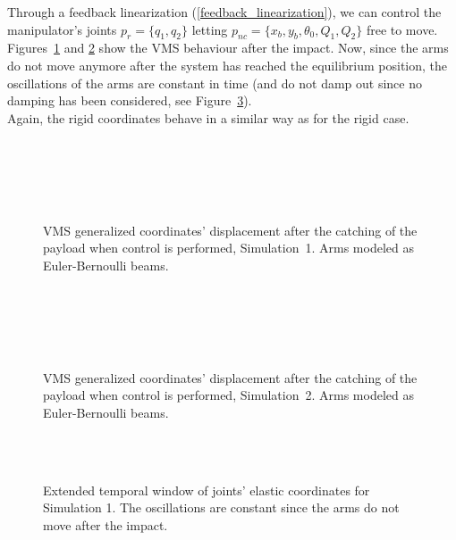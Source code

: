 \documentclass[a4paper,12pt,oneside]{report}
\begin{document}
Through a feedback linearization (\ref{feedback_linearization}), we can control the manipulator's joints $p_r=\{q_1,q_2\}$ letting $p_{nc}=\{x_b,y_b,\theta_0,Q_1,Q_2\}$ free to move.\\
Figures~\ref{contolled_elastic_1} and \ref{controlled_elastic_2} show the VMS behaviour after the impact. Now, since the arms do not move anymore after the system has reached the equilibrium position, the oscillations of the arms are constant in time (and do not damp out since no damping has been considered, see Figure~\ref{no_beat}).\\
Again, the rigid coordinates behave in a similar way as for the rigid case.
\begin{figure}[h]
  \centering
  \subfloat{} \quad
  \subfloat{}\\
  \subfloat{}\\
  \subfloat{}\quad
  \subfloat{}\\
  \subfloat{}\quad
  \subfloat{}\\
  \caption{VMS generalized coordinates’ displacement after the catching of the payload
  when control is performed, Simulation~1. Arms modeled as Euler-Bernoulli beams.}
  \label{contolled_elastic_1}
\end{figure}
\begin{figure}[h]
  \centering
  \subfloat{} \quad
  \subfloat{}\\
  \subfloat{}\\
  \subfloat{}\quad
  \subfloat{}\\
  \subfloat{}\quad
  \subfloat{}\\
  \caption{VMS generalized coordinates’ displacement after the catching of the payload
  when control is performed, Simulation~2. Arms modeled as Euler-Bernoulli beams.}
  \label{controlled_elastic_2}
\end{figure}
\begin{figure}
  \centering
  \\
  \\
  \caption{Extended temporal window of joints' elastic coordinates for Simulation 1. The oscillations are constant since the arms do not move after the impact.}
  \label{no_beat}
\end{figure}
\end{document}
